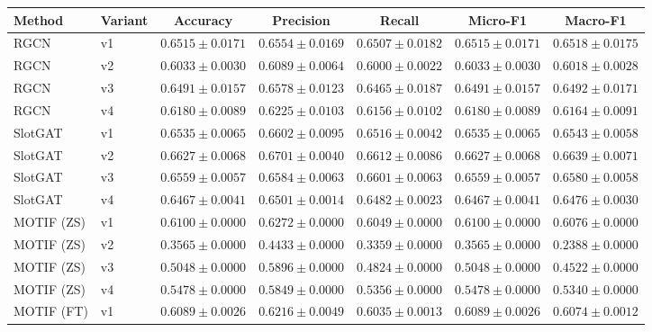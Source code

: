 \documentclass{article}
\begin{document}
\begin{table}[t]
\centering
\small
\begin{tabular}{||l||l||c|c|c||c|c||}
\hline
\textbf{Method} & \textbf{Variant} & \textbf{Accuracy} & \textbf{Precision} & \textbf{Recall} & \textbf{Micro-F1} & \textbf{Macro-F1} \\
\hline\hline
RGCN & v1 & $0.6515 \pm 0.0171$ & $0.6554 \pm 0.0169$ & $0.6507 \pm 0.0182$ & $0.6515 \pm 0.0171$ & $0.6518 \pm 0.0175$ \\
\hline
RGCN & v2 & $0.6033 \pm 0.0030$ & $0.6089 \pm 0.0064$ & $0.6000 \pm 0.0022$ & $0.6033 \pm 0.0030$ & $0.6018 \pm 0.0028$ \\
\hline
RGCN & v3 & $0.6491 \pm 0.0157$ & $0.6578 \pm 0.0123$ & $0.6465 \pm 0.0187$ & $0.6491 \pm 0.0157$ & $0.6492 \pm 0.0171$ \\
\hline
RGCN & v4 & $0.6180 \pm 0.0089$ & $0.6225 \pm 0.0103$ & $0.6156 \pm 0.0102$ & $0.6180 \pm 0.0089$ & $0.6164 \pm 0.0091$ \\
\hline
\hline
SlotGAT & v1 & $0.6535 \pm 0.0065$ & $0.6602 \pm 0.0095$ & $0.6516 \pm 0.0042$ & $0.6535 \pm 0.0065$ & $0.6543 \pm 0.0058$ \\
\hline
SlotGAT & v2 & $0.6627 \pm 0.0068$ & $0.6701 \pm 0.0040$ & $0.6612 \pm 0.0086$ & $0.6627 \pm 0.0068$ & $0.6639 \pm 0.0071$ \\
\hline
SlotGAT & v3 & $0.6559 \pm 0.0057$ & $0.6584 \pm 0.0063$ & $0.6601 \pm 0.0063$ & $0.6559 \pm 0.0057$ & $0.6580 \pm 0.0058$ \\
\hline
SlotGAT & v4 & $0.6467 \pm 0.0041$ & $0.6501 \pm 0.0014$ & $0.6482 \pm 0.0023$ & $0.6467 \pm 0.0041$ & $0.6476 \pm 0.0030$ \\
\hline
\hline
MOTIF (ZS) & v1 & $0.6100 \pm 0.0000$ & $0.6272 \pm 0.0000$ & $0.6049 \pm 0.0000$ & $0.6100 \pm 0.0000$ & $0.6076 \pm 0.0000$ \\
\hline
MOTIF (ZS) & v2 & $0.3565 \pm 0.0000$ & $0.4433 \pm 0.0000$ & $0.3359 \pm 0.0000$ & $0.3565 \pm 0.0000$ & $0.2388 \pm 0.0000$ \\
\hline
MOTIF (ZS) & v3 & $0.5048 \pm 0.0000$ & $0.5896 \pm 0.0000$ & $0.4824 \pm 0.0000$ & $0.5048 \pm 0.0000$ & $0.4522 \pm 0.0000$ \\
\hline
MOTIF (ZS) & v4 & $0.5478 \pm 0.0000$ & $0.5849 \pm 0.0000$ & $0.5356 \pm 0.0000$ & $0.5478 \pm 0.0000$ & $0.5340 \pm 0.0000$ \\
\hline
\hline
MOTIF (FT) & v1 & $0.6089 \pm 0.0026$ & $0.6216 \pm 0.0049$ & $0.6035 \pm 0.0013$ & $0.6089 \pm 0.0026$ & $0.6074 \pm 0.0012$ \\

\end{tabular}
\end{table}
\end{document}
